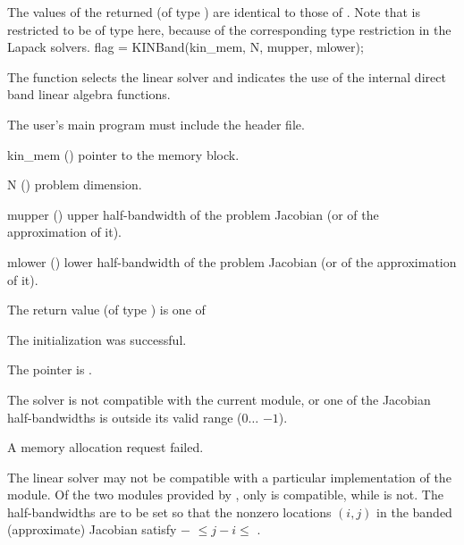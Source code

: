 {
  The values of the returned  (of type ) are identical
  to those of .
}
{
  Note that  is restricted to be of type  here, because
  of the corresponding type restriction in the Lapack solvers.
}
{
  flag = KINBand(kin\_mem, N, mupper, mlower);
}
{
  The function  selects the {\kinband} linear solver and indicates
  the use of the internal direct band linear algebra functions.

  The user's main program must include the  header file.
}
{
  \begin{args}
  \item[kin\_mem] ()
    pointer to the {\kinsol} memory block.
  \item[N] ()
    problem dimension.
  \item[mupper] ()
    upper half-bandwidth of the problem Jacobian (or of the approximation of it).
  \item[mlower] ()
    lower half-bandwidth of the problem Jacobian (or of the approximation of it).
  \end{args}
}
{
  The return value  (of type ) is one of
  \begin{args}
  \item[\Id{KINDLS\_SUCCESS}] 
    The {\kinband} initialization was successful.
  \item[\Id{KINDLS\_MEM\_NULL}]
    The  pointer is .
  \item[\Id{KINDLS\_ILL\_INPUT}]
    The {\kinband} solver is not compatible with the current {\nvector} module, or
    one of the Jacobian half-bandwidths is outside its valid range
    ($0 \ldots$ $-1$).
  \item[\Id{KINDLS\_MEM\_FAIL}]
    A memory allocation request failed.
  \end{args}
}
{
  The {\kinband} linear solver may not be compatible with a particular
  implementation of the {\nvector} module. Of the two {\nvector} modules 
  provided by {\sundials}, only {\nvecs} is compatible, while {\nvecp} is not.
  The half-bandwidths are to be set so that the nonzero locations $(i,j)$ in the
  banded (approximate) Jacobian satisfy $-$ $\leq j-i \leq$ .
}
